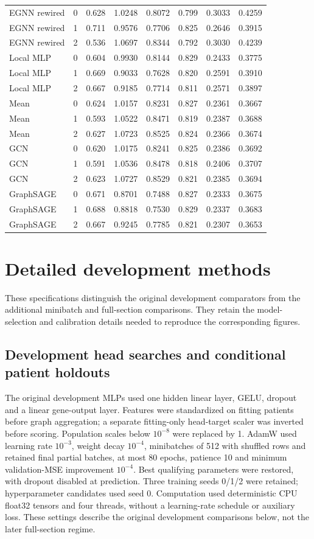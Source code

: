 \begin{longtable}{@{}lrrrrrrr@{}}
EGNN rewired & 0 & 0.628 & 1.0248 & 0.8072 & 0.799 & 0.3033 & 0.4259 \\
EGNN rewired & 1 & 0.711 & 0.9576 & 0.7706 & 0.825 & 0.2646 & 0.3915 \\
EGNN rewired & 2 & 0.536 & 1.0697 & 0.8344 & 0.792 & 0.3030 & 0.4239 \\
Local MLP & 0 & 0.604 & 0.9930 & 0.8144 & 0.829 & 0.2433 & 0.3775 \\
Local MLP & 1 & 0.669 & 0.9033 & 0.7628 & 0.820 & 0.2591 & 0.3910 \\
Local MLP & 2 & 0.667 & 0.9185 & 0.7714 & 0.811 & 0.2571 & 0.3897 \\
Mean & 0 & 0.624 & 1.0157 & 0.8231 & 0.827 & 0.2361 & 0.3667 \\
Mean & 1 & 0.593 & 1.0522 & 0.8471 & 0.819 & 0.2387 & 0.3688 \\
Mean & 2 & 0.627 & 1.0723 & 0.8525 & 0.824 & 0.2366 & 0.3674 \\
GCN & 0 & 0.620 & 1.0175 & 0.8241 & 0.825 & 0.2386 & 0.3692 \\
GCN & 1 & 0.591 & 1.0536 & 0.8478 & 0.818 & 0.2406 & 0.3707 \\
GCN & 2 & 0.623 & 1.0727 & 0.8529 & 0.821 & 0.2385 & 0.3694 \\
GraphSAGE & 0 & 0.671 & 0.8701 & 0.7488 & 0.827 & 0.2333 & 0.3675 \\
GraphSAGE & 1 & 0.688 & 0.8818 & 0.7530 & 0.829 & 0.2337 & 0.3683 \\
GraphSAGE & 2 & 0.667 & 0.9245 & 0.7785 & 0.821 & 0.2307 & 0.3653 \\\bottomrule\end{longtable}
\clearpage
\section{Detailed development methods}
\label{sec:detailed_development}
These specifications distinguish the original development comparators from the additional minibatch and full-section comparisons. They retain the model-selection and calibration details needed to reproduce the corresponding figures.
\subsection{Development head searches and conditional patient holdouts}
The original development MLPs used one hidden linear layer, GELU, dropout and a linear gene-output layer. Features were standardized on fitting patients before graph aggregation; a separate fitting-only head-target scaler was inverted before scoring. Population scales below $10^{-8}$ were replaced by 1. AdamW used learning rate $10^{-3}$, weight decay $10^{-4}$, minibatches of 512 with shuffled rows and retained final partial batches, at most 80 epochs, patience 10 and minimum validation-MSE improvement $10^{-4}$. Best qualifying parameters were restored, with dropout disabled at prediction. Three training seeds 0/1/2 were retained; hyperparameter candidates used seed 0. Computation used deterministic CPU float32 tensors and four threads, without a learning-rate schedule or auxiliary loss. These settings describe the original development comparisons below, not the later full-section regime.


